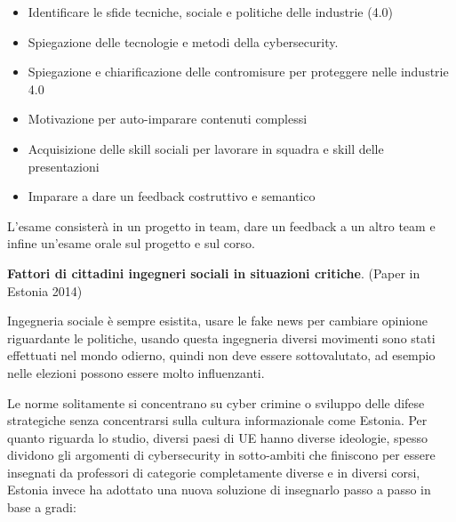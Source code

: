 \documentclass[a4page, 11pt, twocolumn]{article}
\begin{document}
\begin{itemize}
	\item
	Identificare le sfide tecniche, sociale e politiche delle industrie
	(4.0)
	\item
	Spiegazione delle tecnologie e metodi della cybersecurity.
	\item
	Spiegazione e chiarificazione delle contromisure per proteggere nelle
	industrie 4.0
	\item
	Motivazione per auto-imparare contenuti complessi
	\item
	Acquisizione delle skill sociali per lavorare in squadra e skill delle
	presentazioni
	\item
	Imparare a dare un feedback costruttivo e semantico
\end{itemize}

L'esame consisterà in un progetto in team, dare un feedback a un altro
team e infine un'esame orale sul progetto e sul corso.

\textbf{Fattori di cittadini ingegneri sociali in situazioni critiche}.
(Paper in Estonia 2014)

Ingegneria sociale è sempre esistita, usare le fake news per cambiare
opinione riguardante le politiche, usando questa ingegneria diversi
movimenti sono stati effettuati nel mondo odierno, quindi non deve
essere sottovalutato, ad esempio nelle elezioni possono essere molto
influenzanti.

Le norme solitamente si concentrano su cyber crimine o sviluppo delle
difese strategiche senza concentrarsi sulla cultura informazionale come
Estonia. Per quanto riguarda lo studio, diversi paesi di UE hanno
diverse ideologie, spesso dividono gli argomenti di cybersecurity in
sotto-ambiti che finiscono per essere insegnati da professori di
categorie completamente diverse e in diversi corsi, Estonia invece ha
adottato una nuova soluzione di insegnarlo passo a passo in base a
gradi:
\end{document}
